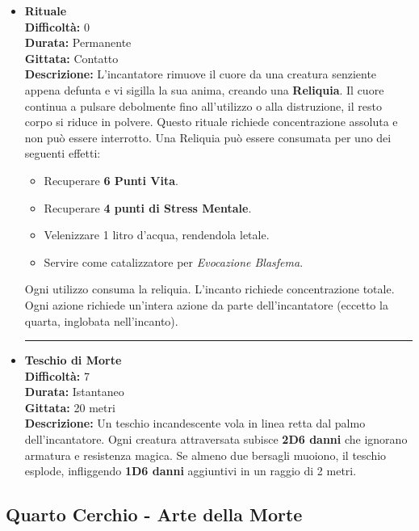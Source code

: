 \documentclass[./magie.tex]{subfiles}
\begin{document}
\begin{itemize}
\vspace{0.5cm}\rule{\textwidth}{0.4pt}\vspace{1cm}
\clearpage
\item \textbf{Rituale} \\
\textbf{Difficoltà:} 0 \\
\textbf{Durata:} Permanente \\
\textbf{Gittata:} Contatto \\
\textbf{Descrizione:} L’incantatore rimuove il cuore da una creatura senziente appena defunta e vi sigilla la sua anima, creando una \textbf{Reliquia}. Il cuore continua a pulsare debolmente fino all’utilizzo o alla distruzione, il resto corpo si riduce in polvere. Questo rituale richiede concentrazione assoluta e non può essere interrotto. Una Reliquia può essere consumata per uno dei seguenti effetti:
\begin{itemize}
  \item Recuperare \textbf{6 Punti Vita}.
  \item Recuperare \textbf{4 punti di Stress Mentale}.
  \item Velenizzare 1 litro d'acqua, rendendola letale.
  \item Servire come catalizzatore per \emph{Evocazione Blasfema}.
\end{itemize}
Ogni utilizzo consuma la reliquia. L'incanto richiede concentrazione totale.
Ogni azione richiede un’intera azione da parte dell’incantatore (eccetto la quarta, inglobata nell’incanto).

\vspace{0.5cm}\rule{\textwidth}{0.4pt}\vspace{1cm}

\item \textbf{Teschio di Morte} \\
\textbf{Difficoltà:} 7 \\
\textbf{Durata:} Istantaneo \\
\textbf{Gittata:} 20 metri \\
\textbf{Descrizione:} Un teschio incandescente vola in linea retta dal palmo dell'incantatore. Ogni creatura attraversata subisce \textbf{2D6 danni} che ignorano armatura e resistenza magica. Se almeno due bersagli muoiono, il teschio esplode, infliggendo \textbf{1D6 danni} aggiuntivi in un raggio di 2 metri.

\end{itemize}

\clearpage
 \subsection*{Quarto Cerchio - Arte della Morte}
\end{document}
